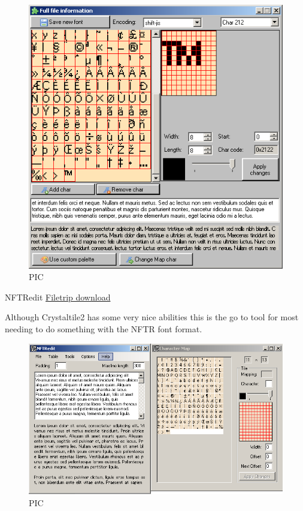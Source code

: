 \documentclass[
]{book}
\begin{document}
\begin{figure}
\centering
\includegraphics{images/115_home_fast6191_romhackingguide_unrenamed_fil___inal_borders_romhackingguidefontnftrtinke_1.png}
\caption{PIC}
\end{figure}

NFTRedit \href{http://filetrip.net/nds-downloads/utilities/download-nftredit-19-f29196.html}{Filetrip download}

Although Crystaltile2 has some very nice abilities this is the go to tool for most needing to do something with the NFTR font format.

\begin{figure}
\centering
\includegraphics{images/116_home_fast6191_romhackingguide_unrenamed_files_and_original_borders_romhackingguidenftredit1.png}
\caption{PIC}
\end{figure}
\end{document}
